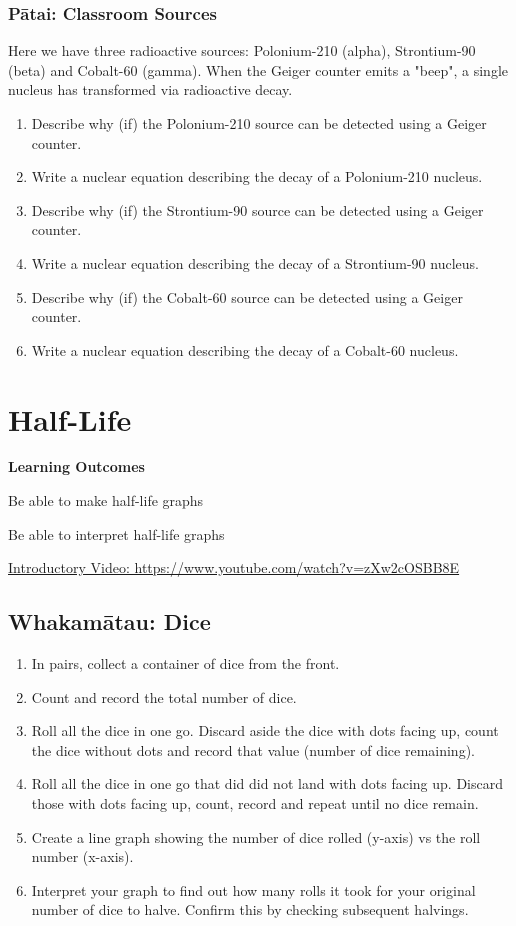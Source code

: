 \documentclass[12pt]{report}
\begin{document}
{\subsection{Pātai: Classroom Sources}
Here we have three radioactive sources: Polonium-210 (alpha), Strontium-90 (beta) and Cobalt-60 (gamma). When the Geiger counter emits a "beep", a single nucleus has transformed via radioactive decay.
\begin{enumerate}[itemsep=1.5cm]
	\item Describe why (if) the Polonium-210 source can be detected using a Geiger counter.
	\item Write a nuclear equation describing the decay of a Polonium-210 nucleus.
	\item Describe why (if) the Strontium-90 source can be detected using a Geiger counter.
	\item Write a nuclear equation describing the decay of a Strontium-90 nucleus.
	\item Describe why (if) the Cobalt-60 source can be detected using a Geiger counter.
	\item Write a nuclear equation describing the decay of a Cobalt-60 nucleus.
\end{enumerate}


\newpage
\chapter{Half-Life}

\noindent\textbf{Learning Outcomes}
\begin{nwa}
	\item Be able to make half-life graphs
	\item Be able to interpret half-life graphs
\end{nwa}

\noindent\href{https://www.youtube.com/watch?v=zXw2cOSBB8E}{Introductory Video: https://www.youtube.com/watch?v=zXw2cOSBB8E}

\section{Whakamātau: Dice}
\begin{enumerate}
	\item In pairs, collect a container of dice from the front.
	\item Count and record the total number of dice.
	\item Roll all the dice in one go. Discard aside the dice with dots facing up, count the dice without dots and record that value (number of dice remaining).
	\item Roll all the dice in one go that did did not land with dots facing up. Discard those with dots facing up, count, record and repeat until no dice remain.
	\item Create a line graph showing the number of dice rolled (y-axis) vs the roll number (x-axis).
	\item Interpret your graph to find out how many rolls it took for your original number of dice to halve. Confirm this by checking subsequent halvings.
\end{enumerate}

}
\end{document}
